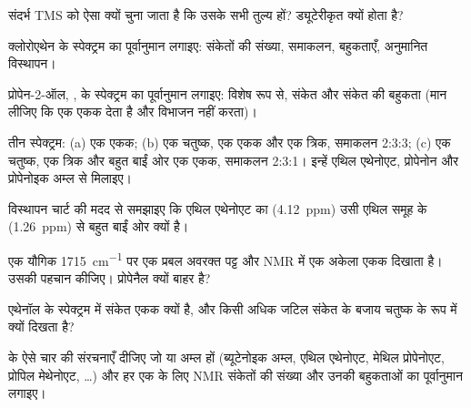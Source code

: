 \begin{exercise}[$\star$]\label{exo:g12:proton-nmr:5}
संदर्भ TMS को ऐसा क्यों चुना जाता है कि उसके सभी  तुल्य हों?
 ड्यूटेरीकृत क्यों होता है?
\end{exercise}

\begin{exercise}[$\star\star$]\label{exo:g12:proton-nmr:6}
क्लोरोएथेन  के स्पेक्ट्रम का पूर्वानुमान लगाइए: संकेतों की संख्या,
समाकलन, बहुकताएँ, अनुमानित विस्थापन।
\end{exercise}

\begin{exercise}[$\star\star$]\label{exo:g12:proton-nmr:7}
प्रोपेन-2-ऑल, , के स्पेक्ट्रम का पूर्वानुमान लगाइए: विशेष रूप से,
 संकेत और  संकेत की बहुकता (मान लीजिए कि
 एक एकक देता है और विभाजन नहीं करता)।
\end{exercise}

\begin{exercise}[$\star\star$]\label{exo:g12:proton-nmr:8}
तीन स्पेक्ट्रम: (a) एक एकक; (b) एक चतुष्क, एक एकक और एक त्रिक,
समाकलन 2:3:3; (c) एक चतुष्क, एक त्रिक और बहुत बाईं ओर एक एकक,
समाकलन 2:3:1। इन्हें एथिल एथेनोएट, प्रोपेनोन और
प्रोपेनोइक अम्ल से मिलाइए।
\end{exercise}

\begin{exercise}[$\star\star$]\label{exo:g12:proton-nmr:9}
विस्थापन चार्ट की मदद से समझाइए कि एथिल एथेनोएट का 
(\qty{4.12}{ppm}) उसी एथिल समूह के  (\qty{1.26}{ppm}) से बहुत बाईं ओर
क्यों है।
\end{exercise}

\begin{exercise}[$\star\star$]\label{exo:g12:proton-nmr:10}
एक यौगिक  \qty{1715}{cm^{-1}} पर एक प्रबल अवरक्त पट्ट
और NMR में एक अकेला एकक दिखाता है। उसकी पहचान कीजिए। प्रोपेनैल
क्यों बाहर है?
\end{exercise}

\begin{exercise}[$\star\star$]\label{exo:g12:proton-nmr:11}
एथेनॉल के स्पेक्ट्रम में  संकेत एकक क्यों है, और
 किसी अधिक जटिल संकेत के बजाय चतुष्क के रूप में क्यों
दिखता है?
\end{exercise}

\begin{exercise}[$\star\star\star$]\label{exo:g12:proton-nmr:12}
 के ऐसे चार  की संरचनाएँ दीजिए जो  या अम्ल हों
(ब्यूटेनोइक अम्ल, एथिल एथेनोएट, मेथिल प्रोपेनोएट, प्रोपिल मेथेनोएट,
\dots) और हर एक के लिए NMR संकेतों की संख्या और उनकी
बहुकताओं का पूर्वानुमान लगाइए।
\end{exercise}

